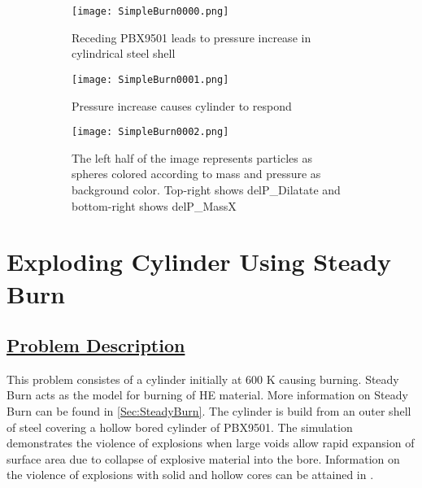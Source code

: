 \begin{figure}
  \centering
  \begin{subfigure}[b]{0.3\textwidth}
    \texttt{[image: SimpleBurn0000.png]}
    \caption{Receding PBX9501 leads to pressure increase in cylindrical steel shell}
    \label{figsimburn1}
  \end{subfigure}
  \begin{subfigure}[b]{0.3\textwidth}
    \texttt{[image: SimpleBurn0001.png]}
    \caption{Pressure increase causes cylinder to respond}
    \label{figsimburn2}
  \end{subfigure}
  \begin{subfigure}[b]{0.3\textwidth}
    \texttt{[image: SimpleBurn0002.png]}
    \caption{The left half of the image represents particles as spheres colored according to mass and pressure as background color.  Top-right shows delP\_Dilatate and bottom-right shows delP\_MassX}
    \label{figsimburn3}
  \end{subfigure}
  \caption{}
  \label{fig:mpmice1}
\end{figure}


\newpage


%
\section*{\center Exploding Cylinder Using Steady Burn}
\subsection*{\underline{Problem Description}}
This problem consistes of a cylinder initially at 600 K causing burning.  Steady Burn acts as the model for burning of HE material.  More information on Steady Burn can be found in \ref{Sec:SteadyBurn}.  The cylinder is build from an outer shell of steel covering a hollow bored cylinder of PBX9501.  The simulation demonstrates the violence of explosions when large voids allow rapid expansion of surface area due to collapse of explosive material into the bore.  Information on the violence of explosions with solid and hollow cores can be attained in \cite{ref:wighteddings}.  

